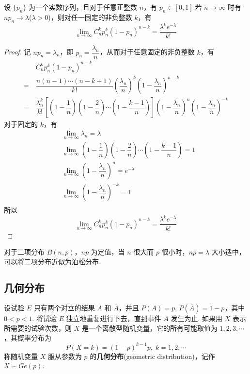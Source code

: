 \begin{theorem}[][泊松定理]
    \indent 设 $\{ p_n \}$ 为一个实数序列，且对于任意正整数 $n$，有 $p_n \in [0,1]$.若 $n \to \infty$ 时有 $n p_n \to \lambda$($\lambda > 0$)，则对任一固定的非负整数 $k$，有
    $$
    \lim_{n\to\infty} C_n^k p_n^k (1-p_n)^{n-k} = \dfrac{\lambda^k e^{-\lambda}}{k!}
    $$
\end{theorem}

\begin{proof}
    记 $n p_n=\lambda_n$，即 $p_n=\dfrac{\lambda_n}{n}$，从而对于任意固定的非负整数 $k$，有
    $$
    \begin{aligned}
        & C_n^k p_n^k (1-p_n)^{n-k} \\
        =\ & \dfrac{n(n-1) \cdots (n-k+1)}{k!} \left( \dfrac{\lambda_n}{n} \right)^k \left( 1-\dfrac{\lambda_n}{n} \right)^{n-k} \\
        =\ & \dfrac{\lambda_n^k}{k!} \left[ \left( 1-\dfrac{1}{n} \right) \left( 1-\dfrac{2}{n} \right) \cdots \left( 1-\dfrac{k-1}{n} \right) \right] \left( 1-\dfrac{\lambda_n}{n} \right)^n \left( 1-\dfrac{\lambda_n}{n} \right)^{-k}
    \end{aligned}
    $$
    对于固定的 $k$，有
    $$
    \begin{aligned}
        & \lim_{n \to \infty} \lambda_n = \lambda \\
        & \lim_{n \to \infty} \left( 1-\dfrac{1}{n} \right) \left( 1-\dfrac{2}{n} \right) \cdots \left( 1-\dfrac{k-1}{n} \right) = 1 \\
        & \lim_{n \to \infty} \left( 1-\dfrac{\lambda_n}{n} \right)^n = e^{-\lambda} \\
        & \lim_{n \to \infty} \left( 1-\dfrac{\lambda_n}{n} \right)^{-k} = 1 \\
    \end{aligned}
    $$
    所以
    $$
    \lim_{n\to\infty} C_n^k p_n^k (1-p_n)^{n-k} = \dfrac{\lambda^k e^{-\lambda}}{k!}
    $$

    \vspace{-1.5em}
\end{proof}

对于二项分布 $B(n,p)$，$np$ 为定值，当 $n$ 很大而 $p$ 很小时，$np = \lambda$ 大小适中，可以将二项分布近似为泊松分布.

\subsection{几何分布}

设试验 $E$ 只有两个对立的结果 $A$ 和 $\overline{A}$，并且 $P(A)=p, \, P(\overline{A})=1-p$，其中 $0<p<1$. 将试验 $E$ 独立地重复进行下去，直到事件 $A$ 发生为止. 如果用 $X$ 表示所需要的试验次数，则 $X$ 是一个离散型随机变量，它的所有可能取值为 $1,2,3,\cdots$，其概率分布为
$$
P(X=k) = (1-p)^{k-1} p, \; k=1,2,\cdots
$$
称随机变量 $X$ 服从参数为 $p$ 的\textbf{几何分布}(geometric distribution)，记作 $X \sim Ge(p)$.

